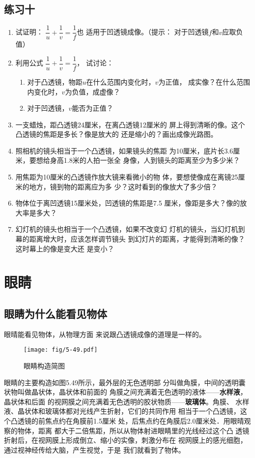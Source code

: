 \subsection*{练习十}

\begin{enumerate}
    \item 试证明：
$\dfrac{1}{u}+\dfrac{1}{v}=\dfrac{1}{f}$也
适用于凹透镜成像。（提示：
对于凹透镜$f$和$v$应取负值）
\item  利用公式
$\dfrac{1}{u}+\dfrac{1}{v}=\dfrac{1}{f}$，
试讨论：
\begin{enumerate}
    \item 对于凸透镜，物距$u$在什么范围内变化时，$v$为正值，
    成实像？在什么范围内变化时，$v$为负值，成虚像？
    \item 对于凹透镜，$v$能否为正值？
\end{enumerate}
\item 一支蜡烛，距凸透镜24厘米，在离凸透镜12厘米的
屏上得到清晰的像。这个凸透镜的焦距是多长？像是放大的
还是缩小的？画出成像光路图。
\item 照相机的镜头相当于一个凸透镜，如果镜头的焦距
为10厘米，底片长3.6厘米，要想给身高1.8米的人拍一张全
身像，人到镜头的距离至少为多少米？
\item 用焦距为10厘米的凸透镜作放大镜来看微小的物
体，要想使像成在离镜25厘米的地方，镜到物的距离应为多
少？这时看到的像放大了多少倍？
\item 物体位于离凹透镜15厘米处，凹透镜的焦距是7.5
厘米，像距是多大？像的放大率是多大？
\item 幻灯机的镜头也相当于一个凸透镜，如果不改变幻
灯机的镜头，当幻灯机到幕的距离增大时，应该怎样调节镜头
到幻灯片的距离，才能得到清晰的像？这时幕上的像是变大还
是变小？
\end{enumerate}

\section{眼睛}
\subsection{眼睛为什么能看见物体}

眼晴能看见物体，从物理方面
来说跟凸透镜成像的道理是一样的。
\begin{figure}[htp]\centering
    \texttt{[image: fig/5-49.pdf]}
    \caption{眼睛构造简图}
    \end{figure}

眼睛的主要构造如图5.49所示，最外层的无色透明部
分叫做角膜，中间的透明囊状物叫做晶状体，晶状体和前面的
角膜之间充满着无色透明的液体——\textbf{水样液}，晶状体和后面
的视网膜之间充满着无色透明的胶状物质——\textbf{玻璃体}。角膜、
水样液、晶状体和玻璃体都对光线产生折射，它们的共同作用
相当于一个凸透镜，这个凸透镜的前焦点约在角膜前1.5厘米
处，后焦点约在角膜后2.0厘米处．用眼晴观察的物体，距离
都大于二倍焦距，所以从物体射进眼睛里的光线经过这个凸
透镜折射后，在视网膜上形成倒立、缩小的实像，刺激分布在
视网膜上的感光细胞，通过视神经传给大脑，产生视觉，于是
我们就看到了物体。

